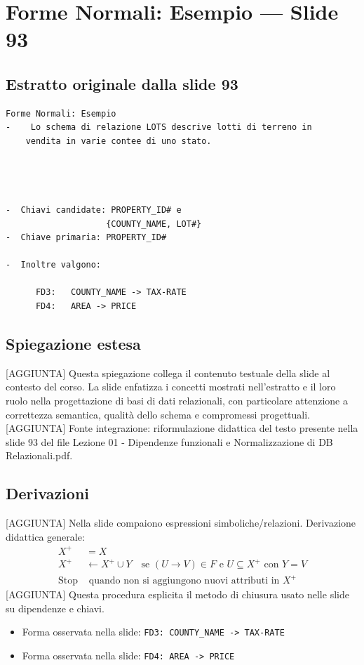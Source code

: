 \documentclass[11pt]{article}
\begin{document}
\section{Forme Normali: Esempio --- Slide 93}
\subsection*{Estratto originale dalla slide 93}
\begin{lstlisting}
Forme Normali: Esempio
-    Lo schema di relazione LOTS descrive lotti di terreno in
    vendita in varie contee di uno stato.




-  Chiavi candidate: PROPERTY_ID# e
                    {COUNTY_NAME, LOT#}
-  Chiave primaria: PROPERTY_ID#

-  Inoltre valgono:

      FD3:   COUNTY_NAME -> TAX-RATE
      FD4:   AREA -> PRICE
\end{lstlisting}
\subsection*{Spiegazione estesa}
[AGGIUNTA] Questa spiegazione collega il contenuto testuale della slide al contesto del corso. La slide enfatizza i concetti mostrati nell'estratto e il loro ruolo nella progettazione di basi di dati relazionali, con particolare attenzione a correttezza semantica, qualità dello schema e compromessi progettuali.
[AGGIUNTA] Fonte integrazione: riformulazione didattica del testo presente nella slide 93 del file Lezione 01 - Dipendenze funzionali e Normalizzazione di DB Relazionali.pdf.
\subsection*{Derivazioni}
[AGGIUNTA] Nella slide compaiono espressioni simboliche/relazioni. Derivazione didattica generale:
\begin{align*}
X^+ &= X \\
X^+ &\leftarrow X^+ \cup Y \quad \text{se } (U \to V) \in F \text{ e } U \subseteq X^+ \text{ con } Y=V \\
\text{Stop} &\text{ quando non si aggiungono nuovi attributi in } X^+
\end{align*}
[AGGIUNTA] Questa procedura esplicita il metodo di chiusura usato nelle slide su dipendenze e chiavi.
\begin{itemize}[leftmargin=*]
\item Forma osservata nella slide: \texttt{FD3:   COUNTY\_NAME -> TAX-RATE}
\item Forma osservata nella slide: \texttt{FD4:   AREA -> PRICE}
\end{itemize}
\end{document}
